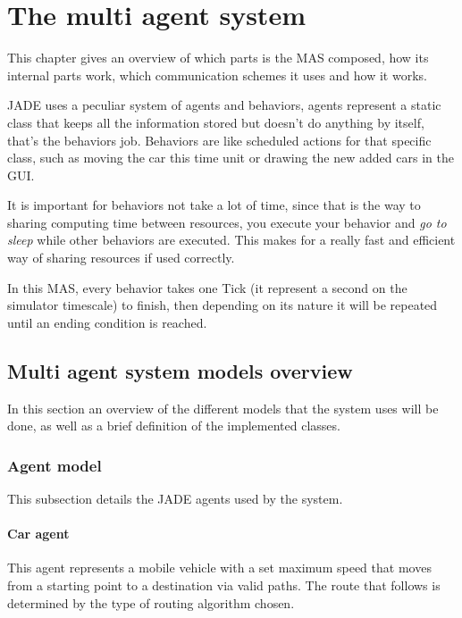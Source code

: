 \chapter{The multi agent system}
\label{ch:multiagentsystem}

This chapter gives an overview of which parts is the MAS composed, how its internal parts work, which communication schemes it uses and how it works.

JADE uses a peculiar system of agents and behaviors, agents represent a static class that keeps all the information stored but doesn't do anything by itself, that's the behaviors job. Behaviors are like scheduled actions for that specific class, such as moving the car this time unit or drawing the new added cars in the GUI.

It is important for behaviors not take a lot of time, since that is the way to sharing computing time between resources, you execute your behavior and \textit{go to sleep} while other behaviors are executed. This makes for a really fast and efficient way of sharing resources if used correctly.

In this MAS, every behavior takes one Tick (it represent a second on the simulator timescale) to finish, then depending on its nature it will be repeated until an ending condition is reached.

\section{Multi agent system models overview}

In this section an overview of the different models that the system uses will be done, as well as a brief definition of the implemented classes.

\subsection{Agent model}

This subsection details the JADE agents used by the system.

\subsubsection{Car agent}

This agent represents a mobile vehicle with a set maximum speed that moves from a starting point to a destination via valid paths. The route that follows is determined by the type of routing algorithm chosen.

